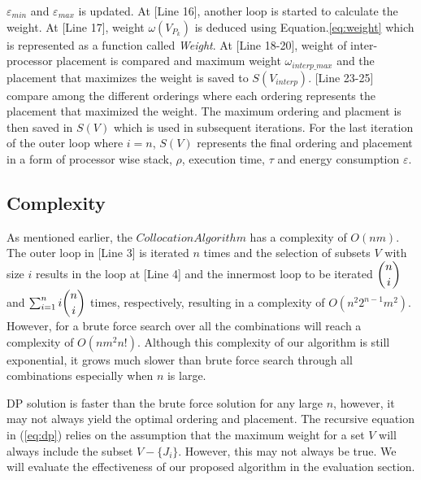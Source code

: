 $\varepsilon_{min}$ and $\varepsilon_{max}$ is updated. At [Line 16], another loop is started to calculate
the weight. At [Line 17], weight $\omega(V_{P_k})$ is deduced using Equation.\ref{eq:weight} which is represented as a function
called \emph{Weight}. At [Line 18-20], weight of inter-processor placement is compared and maximum weight $\omega_{interp\_max}$ 
and the placement that maximizes the weight is saved to $S(V_{interp})$. [Line 23-25] compare among the different 
orderings where each ordering represents the placement that maximized the weight. The maximum ordering and placment is then 
saved in 
$S(V)$ which is used in subsequent iterations. For the last iteration of the outer loop where $i=n$, $S(V)$ represents the 
final ordering and placement in a form of processor wise stack, $\rho$, execution time, $\tau$ and energy consumption 
$\varepsilon$. 
  


\subsection{Complexity}
As mentioned earlier, the $Collocation Algorithm$ has a complexity of $O(nm)$.
The outer loop in [Line 3] is iterated $n$ times and the selection of subsets $V$ with size $i$ results in the loop at [Line 4]
and the innermost loop to be iterated $\dbinom{n}{i}$ and $\sum_{i=1}^{n} i\dbinom{n}{i}$ times, respectively, resulting in a
complexity of $O(n^2 2^{n-1} m^2)$. However, for a brute force search over all the combinations will reach a complexity of
 $O(n m^2 n!)$. Although this complexity of our algorithm is still exponential, it grows much slower than brute force search
through all combinations especially when $n$ is large.

DP solution is faster than the brute force solution for any large $n$, however, it may not always yield the optimal
ordering and placement. The recursive equation in (\ref{eq:dp}) relies on the assumption that the maximum weight for a set 
$V$ will always
include the subset $V-\{J_i\}$. However, this may not always be true. We will evaluate the effectiveness of our proposed
algorithm in the evaluation section.




